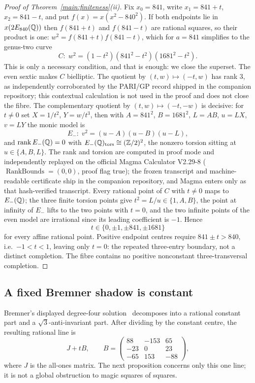 \begin{proof}[Proof of Theorem~\ref{main:finiteness}(ii)]
Fix $x_0=841$, write $x_1=841+t$, $x_2=841-t$, and put
$f(x)=x(x^2-840^2)$. If both endpoints lie in $x(2E_{840}(\mathbb{Q}))$ then $f(841+t)$
and $f(841-t)$ are rational squares, so their product is one:
$w^2=f(841+t)f(841-t)$, which for $a=841$ simplifies to the genus-two
curve
\[
C:\;w^2=(1-t^2)(841^2-t^2)(1681^2-t^2).
\]
This is only a necessary condition, and that is enough: we close the
superset. The even sextic makes $C$ bielliptic. The quotient by
$(t,w)\mapsto(-t,w)$ has rank $3$, as independently corroborated by the
PARI/GP record shipped in the companion repository; this contextual
calculation is not used in the proof and does not close the fibre. The complementary quotient by $(t,w)\mapsto(-t,-w)$ is decisive: for $t\neq0$
set $X=1/t^2$, $Y=w/t^3$, then with $A=841^2$, $B=1681^2$, $L=AB$,
$u=LX$, $v=LY$ the monic model is
\[
E_-:\;v^2=(u-A)(u-B)(u-L),
\]
and $\operatorname{rank}E_-(\mathbb{Q})=0$ with
$E_-(\mathbb{Q})_{\mathrm{tors}}\cong(\mathbb{Z}/2)^2$, the nonzero torsion sitting at
$u\in\{A,B,L\}$. The rank and torsion are computed in proof mode and
independently replayed on the official Magma Calculator V2.29-8
($\operatorname{RankBounds}=(0,0)$, proof flag true); the frozen transcript
and machine-readable certificate ship in the companion repository, and
Magma enters only as that hash-verified transcript. Every rational point of
$C$ with $t\neq0$ maps to $E_-(\mathbb{Q})$; the three finite torsion points give
$t^2=L/u\in\{1,A,B\}$, the point at infinity of $E_-$ lifts to the two
points with $t=0$, and the two infinite points of the even model are
irrational since its leading coefficient is $-1$. Hence
\[
t\in\{0,\pm1,\pm841,\pm1681\}
\]
for every affine rational point. Positive endpoint centres require
$841\pm t>840$, i.e.\ $-1<t<1$, leaving only $t=0$: the repeated
three-entry boundary, not a distinct completion. The fibre contains no
positive nonconstant three-transversal completion.
\end{proof}

\subsection{A fixed Bremner shadow is constant}

Bremner's displayed degree-four solution~\cite{BRE01} decomposes into a
rational constant part and a $\sqrt3$-anti-invariant part. After dividing
by the constant centre, the resulting rational line is
\[
 J+tB,\qquad
 B=\begin{pmatrix}
 88&-153&65\\ -23&0&23\\ -65&153&-88
 \end{pmatrix},
\]
where $J$ is the all-ones matrix. The next proposition concerns only this
one line; it is not a global obstruction to magic squares of squares.

